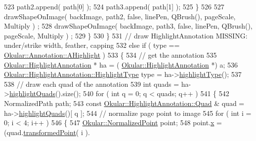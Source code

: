 \begin{DoxyCode}
523                             path2.append( path[0] );
524                             path3.append( path[1] );
525                         \}
526 
527                         drawShapeOnImage( backImage, path2, \textcolor{keyword}{false}, linePen, QBrush(), pageScale, Multiply )
      ;
528                         drawShapeOnImage( backImage, path3, \textcolor{keyword}{false}, linePen, QBrush(), pageScale, Multiply )
      ;
529                     \}
530                 \}
531                 \textcolor{comment}{// draw HighlightAnnotation MISSING: under/strike width, feather, capping}
532                 \textcolor{keywordflow}{else} \textcolor{keywordflow}{if} ( type == \hyperlink{classOkular_1_1Annotation_af71b46e37d5f850b97d5c4de3be9aac0a03e002f9ae62005b2d7c7f1445507501}{Okular::Annotation::AHighlight} )
533                 \{
534                     \textcolor{comment}{// get the annotation}
535                     \hyperlink{classOkular_1_1HighlightAnnotation}{Okular::HighlightAnnotation} * ha = (
      \hyperlink{classOkular_1_1HighlightAnnotation}{Okular::HighlightAnnotation} *) a;
536                     \hyperlink{classOkular_1_1HighlightAnnotation_a63d2488735d1d6320e2e118743243999}{Okular::HighlightAnnotation::HighlightType} 
      type = ha->\hyperlink{classOkular_1_1HighlightAnnotation_a3e95972aebea730877a033f8b2908b90}{highlightType}();
537 
538                     \textcolor{comment}{// draw each quad of the annotation}
539                     \textcolor{keywordtype}{int} quads = ha->\hyperlink{classOkular_1_1HighlightAnnotation_ac0099fec5f383ea7296b86db15b6c08c}{highlightQuads}().size();
540                     \textcolor{keywordflow}{for} ( \textcolor{keywordtype}{int} q = 0; q < quads; q++ )
541                     \{
542                         NormalizedPath path;
543                         \textcolor{keyword}{const} \hyperlink{classOkular_1_1HighlightAnnotation_1_1Quad}{Okular::HighlightAnnotation::Quad} & quad = 
      ha->\hyperlink{classOkular_1_1HighlightAnnotation_ac0099fec5f383ea7296b86db15b6c08c}{highlightQuads}()[ q ];
544                         \textcolor{comment}{// normalize page point to image}
545                         \textcolor{keywordflow}{for} ( \textcolor{keywordtype}{int} i = 0; i < 4; i++ )
546                         \{
547                             \hyperlink{classOkular_1_1NormalizedPoint}{Okular::NormalizedPoint} point;
548                             point.\hyperlink{classOkular_1_1NormalizedPoint_a857f49b9bc7712430d167472ef9dbd94}{x} = (quad.\hyperlink{classOkular_1_1HighlightAnnotation_1_1Quad_acb6ab9f7ca3003937f7829941f5a0d52}{transformedPoint}( i ).

\end{DoxyCode}
